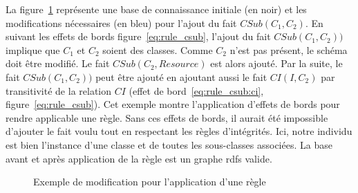 \begin{example}
    La figure~\ref{fig:app_rule} représente une base de connaissance initiale (en noir) et les modifications nécessaires (en bleu) pour l'ajout du fait $CSub(C_1, C_2)$.
    En suivant les effets de bords figure~\ref{eq:rule_csub}, l'ajout du fait $CSub(C_1, C_2))$ implique que $C_1$ et $C_2$ soient des classes.
    Comme $C_2$ n'est pas présent, le schéma doit être modifié.
    Le fait $CSub(C_2, Resource)$ est alors ajouté.
    Par la suite, le fait $CSub(C_1, C_2))$ peut être ajouté en ajoutant aussi le fait $CI(I, C_2)$ par transitivité de la relation $CI$ (effet de bord~\ref{eq:rule_csub:ci}, figure~\ref{eq:rule_csub}).
    Cet exemple montre l'application d'effets de bords pour rendre applicable une règle.
    Sans ces effets de bords, il aurait été impossible d'ajouter le fait voulu tout en respectant les règles d'intégrités.
    Ici, notre individu est bien l'instance d'une classe et de toutes les sous-classes associées.
    La base avant et après application de la règle est un graphe \gls{rdfs} valide.
\end{example}

\begin{figure}[ht]
    \centering
    \caption{Exemple de modification pour l'application d'une règle}
    \label{fig:app_rule}
\end{figure}

